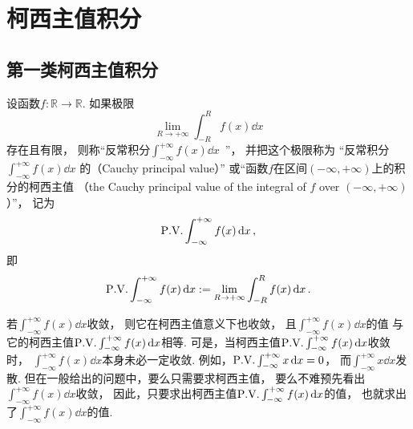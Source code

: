 \section{柯西主值积分}
\subsection{第一类柯西主值积分}
\begin{definition}
设函数\(f\colon\mathbb{R}\to\mathbb{R}\).
如果极限\begin{equation*}
	\lim_{R\to+\infty} \int_{-R}^R f(x) \dd{x}
\end{equation*}存在且有限，
则称“反常积分\(\int_{-\infty}^{+\infty} f(x) \dd{x}\)~”，
并把这个极限称为
“反常积分\(\int_{-\infty}^{+\infty} f(x) \dd{x}\)
的（Cauchy principal value）”
或“函数\(f\)在区间\((-\infty,+\infty)\)上的积分的柯西主值
（the Cauchy principal value of the integral of \(f\) over \((-\infty,+\infty)\)）”，
记为\begin{equation*}
	\pvint_{-\infty}^{+\infty} f(x) \dd{x},
\end{equation*}
即\begin{equation*}
	\pvint_{-\infty}^{+\infty} f(x) \dd{x}
	\defeq \lim_{R\to+\infty} \int_{-R}^R f(x) \dd{x}.
\end{equation*}
\end{definition}

若\(\int_{-\infty}^{+\infty} f(x) \dd{x}\)收敛，
则它在柯西主值意义下也收敛，
且\(\int_{-\infty}^{+\infty} f(x) \dd{x}\)的值
与它的柯西主值\(\pvint_{-\infty}^{+\infty} f(x) \dd{x}\)相等.
可是，当柯西主值\(\pvint_{-\infty}^{+\infty} f(x) \dd{x}\)收敛时，
\(\int_{-\infty}^{+\infty} f(x) \dd{x}\)本身未必一定收敛.
例如，\(\pvint_{-\infty}^{+\infty} x \dd{x} = 0\)，
而\(\int_{-\infty}^{+\infty} x \dd{x}\)发散.
但在一般给出的问题中，要么只需要求柯西主值，
要么不难预先看出\(\int_{-\infty}^{+\infty} f(x) \dd{x}\)收敛，
因此，只要求出柯西主值\(\pvint_{-\infty}^{+\infty} f(x) \dd{x}\)的值，
也就求出了\(\int_{-\infty}^{+\infty} f(x) \dd{x}\)的值.

